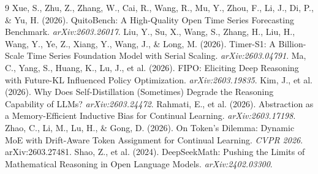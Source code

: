 \documentclass[11pt]{article}
\begin{document}
\begin{thebibliography}{9}
 Xue, S., Zhu, Z., Zhang, W., Cai, R., Wang, R., Mu, Y., Zhou, F., Li, J., Di, P., \& Yu, H. (2026). QuitoBench: A High-Quality Open Time Series Forecasting Benchmark. \textit{arXiv:2603.26017}.
 Liu, Y., Su, X., Wang, S., Zhang, H., Liu, H., Wang, Y., Ye, Z., Xiang, Y., Wang, J., \& Long, M. (2026). Timer-S1: A Billion-Scale Time Series Foundation Model with Serial Scaling. \textit{arXiv:2603.04791}.
 Ma, C., Yang, S., Huang, K., Lu, J., et al. (2026). FIPO: Eliciting Deep Reasoning with Future-KL Influenced Policy Optimization. \textit{arXiv:2603.19835}.
 Kim, J., et al. (2026). Why Does Self-Distillation (Sometimes) Degrade the Reasoning Capability of LLMs? \textit{arXiv:2603.24472}.
 Rahmati, E., et al. (2026). Abstraction as a Memory-Efficient Inductive Bias for Continual Learning. \textit{arXiv:2603.17198}.
 Zhao, C., Li, M., Lu, H., \& Gong, D. (2026). On Token's Dilemma: Dynamic MoE with Drift-Aware Token Assignment for Continual Learning. \textit{CVPR 2026}. arXiv:2603.27481.
 Shao, Z., et al. (2024). DeepSeekMath: Pushing the Limits of Mathematical Reasoning in Open Language Models. \textit{arXiv:2402.03300}.
\end{thebibliography}
\end{document}

